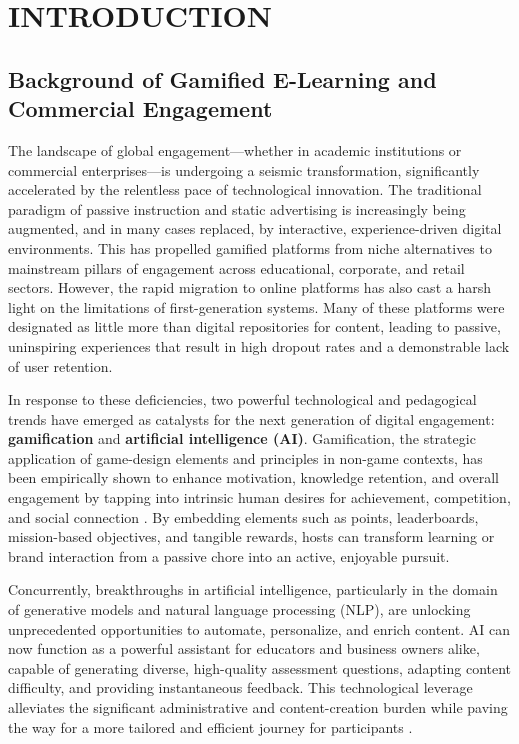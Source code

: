 \chapter{INTRODUCTION}
\label{chap:introduction}

\section{Background of Gamified E-Learning and Commercial Engagement}
\label{sec:intro_background}
The landscape of global engagement—whether in academic institutions or commercial enterprises—is undergoing a seismic transformation, significantly accelerated by the relentless pace of technological innovation. The traditional paradigm of passive instruction and static advertising is increasingly being augmented, and in many cases replaced, by interactive, experience-driven digital environments. This has propelled gamified platforms from niche alternatives to mainstream pillars of engagement across educational, corporate, and retail sectors. However, the rapid migration to online platforms has also cast a harsh light on the limitations of first-generation systems. Many of these platforms were designated as little more than digital repositories for content, leading to passive, uninspiring experiences that result in high dropout rates and a demonstrable lack of user retention.

In response to these deficiencies, two powerful technological and pedagogical trends have emerged as catalysts for the next generation of digital engagement: \textbf{gamification} and \textbf{artificial intelligence (AI)}. Gamification, the strategic application of game-design elements and principles in non-game contexts, has been empirically shown to enhance motivation, knowledge retention, and overall engagement by tapping into intrinsic human desires for achievement, competition, and social connection \citep{oliveira2023}. By embedding elements such as points, leaderboards, mission-based objectives, and tangible rewards, hosts can transform learning or brand interaction from a passive chore into an active, enjoyable pursuit.

Concurrently, breakthroughs in artificial intelligence, particularly in the domain of generative models and natural language processing (NLP), are unlocking unprecedented opportunities to automate, personalize, and enrich content. AI can now function as a powerful assistant for educators and business owners alike, capable of generating diverse, high-quality assessment questions, adapting content difficulty, and providing instantaneous feedback. This technological leverage alleviates the significant administrative and content-creation burden while paving the way for a more tailored and efficient journey for participants \citep{kasneci2023}.

